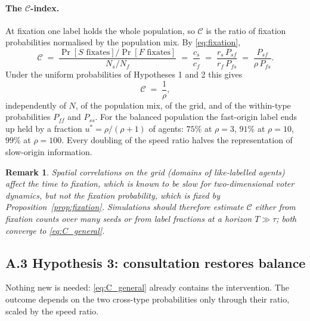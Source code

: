 \documentclass{article}
\newcommand{\Pab}[2]{P_{#1#2}}      %
\newcommand{\Cidx}{\mathcal{C}}      %
\newtheorem{remark}{Remark}
\begin{document}
\paragraph{The $\Cidx$-index.} At fixation one label holds the whole population, so $\Cidx$ is the ratio of fixation probabilities normalised by the population mix. By \eqref{eq:fixation},
\begin{equation}
\Cidx \;=\; \frac{\Pr[S \text{ fixates}] / \Pr[F \text{ fixates}]}{N_s / N_f}
\;=\; \frac{c_s}{c_f}
\;=\; \frac{r_s\, \Pab{s}{f}}{r_f\, \Pab{f}{s}}
\;=\; \frac{\Pab{s}{f}}{\rho\, \Pab{f}{s}}.
\label{eq:C_general}
\end{equation}
Under the uniform probabilities of Hypotheses 1 and 2 this gives
\begin{equation}
\Cidx \;=\; \frac{1}{\rho},
\label{eq:C_uniform}
\end{equation}
independently of $N$, of the population mix, of the grid, and of the within-type probabilities $\Pab{f}{f}$ and $\Pab{s}{s}$. For the balanced population the fast-origin label ends up held by a fraction $u^\ast = \rho/(\rho+1)$ of agents: $75\%$ at $\rho = 3$, $91\%$ at $\rho = 10$, $99\%$ at $\rho = 100$. Every doubling of the speed ratio halves the representation of slow-origin information.

\begin{remark}
Spatial correlations on the grid (domains of like-labelled agents) affect the \emph{time} to fixation, which is known to be slow for two-dimensional voter dynamics, but not the fixation \emph{probability}, which is fixed by Proposition~\ref{prop:fixation}. Simulations should therefore estimate $\Cidx$ either from fixation counts over many seeds or from label fractions at a horizon $T \gg \tau$; both converge to \eqref{eq:C_general}.
\end{remark}

\subsection*{A.3 \quad Hypothesis 3: consultation restores balance}

Nothing new is needed: \eqref{eq:C_general} already contains the intervention. The outcome depends on the two cross-type probabilities only through their ratio, scaled by the speed ratio.
\end{document}
